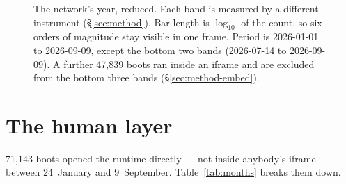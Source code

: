 \documentclass[10pt,letterpaper,twocolumn]{article}
\begin{document}
\begin{figure}[t]
\centering
{}
\caption{The network's year, reduced. Each band is measured by a different instrument (\S\ref{sec:method}). Bar length is $\log_{10}$ of the count, so six orders of magnitude stay visible in one frame. Period is 2026-01-01 to 2026-09-09, except the bottom two bands (2026-07-14 to 2026-09-09). A further 47,839 boots ran inside an iframe and are excluded from the bottom three bands (\S\ref{sec:method-embed}).}
\label{fig:funnel}
\end{figure}

\section{The human layer}
\label{sec:human}

71,143 boots opened the runtime directly --- not inside anybody's
iframe --- between 24~January and 9~September.
Table~\ref{tab:months} breaks them down.
\end{document}
